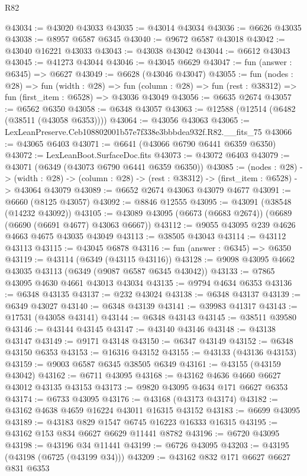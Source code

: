 \begin{lexlean}{R82}
\begin{coremodule}
@43034 := @43020 @43033
@43035 := @43014 @43034
@43036 := @6626 @43035
@43038 := @8957 @6587 @6345
@43040 := @9672 @6587 @43018
@43042 := @43040 @16221 @43033
@43043 := @43038 @43042
@43044 := @6612 @43043
@43045 := @41273 @43044
@43046 := @43045 @6629
@43047 := fun (answer : @6345) => @6627
@43049 := @6628 (@43046 @43047)
@43055 := fun (nodes : @28) =>
  fun (width : @28) =>
  fun (column : @28) => fun (rest : @38312) => fun (first_item : @6528) => @43036 @43049
@43056 := @6635 @2674
@43057 := @6562 @6350
@43058 := @6348 @43057
@43063 := @12588 (@12514 (@6482 (@38511 (@43058 @6353))))
@43064 := @43056 @43063
@43065 := LexLeanPreserve.Ceb108802001b57e7f338e3bbbdea932f.R82.__fits_75
@43066 := @43065 @6403
@43071 := @6641 (@43066 @6790 @6441 @6359 @6350)
@43072 := LexLeanBoot.SurfaceDoc.fits
@43073 := @43072 @6403
@43079 := @43071 (@6349 (@43073 @6790 @6441 @6359 @6350))
@43085 := (nodes : @28) ->
  (width : @28) -> (column : @28) -> (rest : @38312) -> (first_item : @6528) -> @43064 @43079
@43089 := @6652 @2674 @43063 @43079 @4677
@43091 := @6660 (@8125 @43057)
@43092 := @8846 @12555
@43095 := @43091 (@38548 (@14232 @43092))
@43105 := @43089 @43095 (@6673 (@6683 @2674)) (@6689 (@6690 (@6691 @4677) @43063 @6667))
@43112 := @9055 @43095 @239 @4626 @4663 @4675 @43035 @43049
@43113 := @38505 @43043
@43114 := @43112 @43113
@43115 := @43045 @6878
@43116 := fun (answer : @6345) => @6350
@43119 := @43114 (@6349 (@43115 @43116))
@43128 := @9098 @43095 @4662 @43035 @43113 (@6349 (@9087 @6587 @6345 @43042))
@43133 := @7865 @43095 @4630 @4661 @43013 @43034
@43135 := @9794 @4634 @6353
@43136 := @6348 @43135
@43137 := @232 @43024
@43138 := @6348 @43137
@43139 := @6349 @43027
@43140 := @6348 @43139
@43141 := @39983 @41317
@43143 := @17531 (@43058 @43141)
@43144 := @6348 @43143
@43145 := @38511 @39580
@43146 := @43144 @43145
@43147 := @43140 @43146
@43148 := @43138 @43147
@43149 := @9171 @43148
@43150 := @6347 @43149
@43152 := @6348 @43150 @6353
@43153 := @16316 @43152
@43155 := @43133 (@43136 @43153)
@43159 := @9003 @6587 @6345 @38505 @6349
@43161 := @43155 (@43159 @43042)
@43162 := @6711 @43095
@43168 := @43162 @4636 @4660 @6627 @43012 @43135 @43153
@43173 := @9820 @43095 @4634 @171 @6627 @6353
@43174 := @6733 @43095
@43176 := @43168 (@43173 @43174)
@43182 := @43162 @4638 @4659 @16224 @43011 @16315 @43152
@43183 := @6699 @43095
@43189 := @43183 @829 @1547 @6745 @16223 @16333 @16315
@43195 := @43162 @153 @834 @6627 @6629 @11441 @8782
@43196 := @6720 @43095
@43198 := @43196 @34 @11441
@43199 := @6726 @43095
@43203 := @43195 (@43198 (@6725 (@43199 @34)))
@43209 := @43162 @832 @171 @6627 @6627 @831 @6353

\end{coremodule}
\end{lexlean}
